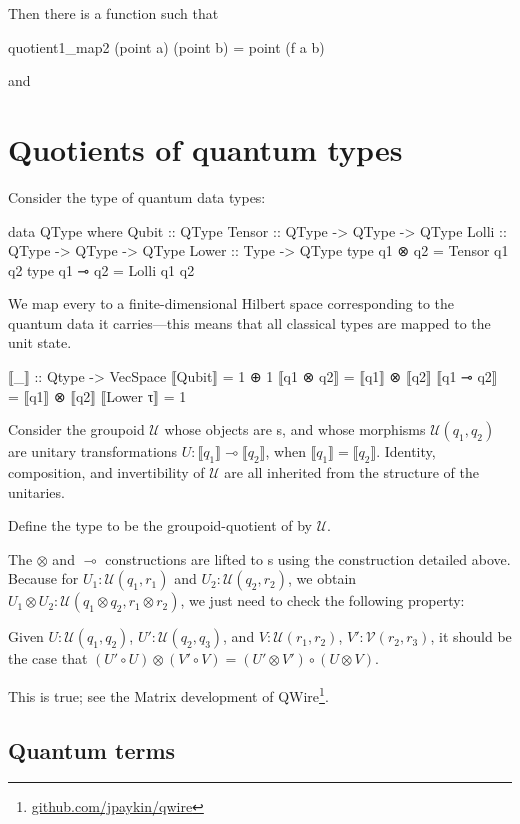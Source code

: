 \documentclass{article}
\begin{document}
Then there is a function  such that 
\begin{haskell}
    quotient1_map2 (point a) (point b) = point (f a b)
\end{haskell}
and 

\section{Quotients of quantum types}

Consider the type of quantum data types:
\begin{haskell}
data QType where
  Qubit  :: QType
  Tensor :: QType -> QType -> QType
  Lolli  :: QType -> QType -> QType
  Lower  :: Type -> QType
type q1 ⊗ q2 = Tensor q1 q2
type q1 ⊸ q2 = Lolli q1 q2
\end{haskell}

We map every  to a finite-dimensional Hilbert space corresponding
to the quantum data it carries---this means that all classical types are mapped
to the unit state.
\begin{haskell}
⟦_⟧ :: Qtype -> VecSpace
⟦Qubit⟧   = 1 ⊕ 1
⟦q1 ⊗ q2⟧ = ⟦q1⟧ ⊗ ⟦q2⟧
⟦q1 ⊸ q2⟧ = ⟦q1⟧ ⊗ ⟦q2⟧
⟦Lower τ⟧ = 1
\end{haskell}

Consider the groupoid $\mathcal{U}$ whose objects are s, and whose
morphisms $\mathcal{U}(q_1,q_2)$ are unitary transformations $U : ⟦q_1⟧ ⊸ ⟦q_2⟧$,
when $⟦q_1⟧=⟦q_2⟧$.  Identity,
composition, and invertibility of $\mathcal{U}$ are all inherited from the
structure of the unitaries.

Define the type  to be the groupoid-quotient of  by
$\mathcal{U}$.

The $⊗$ and $⊸$ constructions are lifted to s using the
 construction detailed above. Because
for $U_1 : \mathcal{U}(q_1,r_1)$ and $U_2 : \mathcal{U}(q_2,r_2)$,
we obtain $U_1 ⊗ U_2 : \mathcal{U}(q_1 ⊗ q_2, r_1 ⊗ r_2)$, we just need to check
the following property:

\begin{lemma}
    Given $U : \mathcal{U}(q_1,q_2)$, $U' : \mathcal{U}(q_2,q_3)$,
    and $V : \mathcal{U}(r_1,r_2)$, $V' : \mathcal{V}(r_2,r_3)$,
    it should be the case that
    $(U' ∘ U) ⊗ (V' ∘ V) = (U' ⊗ V') ∘ (U ⊗ V)$.
\end{lemma}
This is true; see the Matrix development of
QWire\footnote{\url{github.com/jpaykin/qwire}}.



\subsection{Quantum terms}








\end{document}
